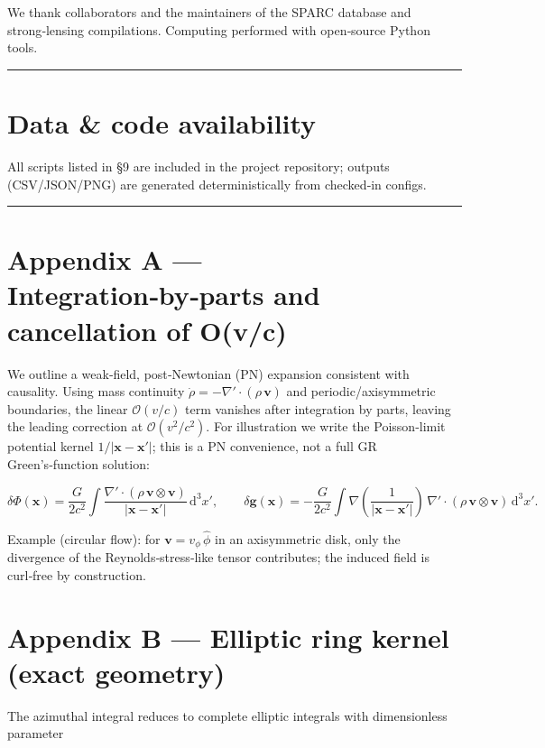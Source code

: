 \documentclass[11pt,a4paper]{article}
\begin{document}
We thank collaborators and the maintainers of the SPARC database and strong‑lensing compilations. Computing performed with open‑source Python tools.


\medskip\hrule\medskip


\section{Data \& code availability}


All scripts listed in §9 are included in the project repository; outputs (CSV/JSON/PNG) are generated deterministically from checked‑in configs.


\medskip\hrule\medskip


\section{Appendix A — Integration‑by‑parts and cancellation of O(v/c)}


We outline a weak‑field, post‑Newtonian (PN) expansion consistent with causality. Using mass continuity $\dot\rho=-\nabla'\!\cdot(\rho\,\mathbf{v})$ and periodic/axisymmetric boundaries, the linear $\mathcal{O}(v/c)$ term vanishes after integration by parts, leaving the leading correction at $\mathcal{O}(v^2/c^2)$. For illustration we write the Poisson‑limit potential kernel $1/\lvert \mathbf{x}-\mathbf{x}'\rvert$; this is a PN convenience, not a full GR Green’s‑function solution:


\begin{equation}
\delta\Phi(\mathbf{x}) = \frac{G}{2c^2} \int \frac{\nabla'\!\cdot(\rho\,\mathbf{v}\!\otimes\!\mathbf{v})}{\lvert \mathbf{x}-\mathbf{x}'\rvert}\,\mathrm{d}^3\!x' ,\qquad
\delta\mathbf{g}(\mathbf{x}) = -\frac{G}{2c^2} \int \nabla\!\left(\frac{1}{\lvert \mathbf{x}-\mathbf{x}'\rvert}\right) \, \nabla'\!\cdot(\rho\,\mathbf{v}\!\otimes\!\mathbf{v})\,\mathrm{d}^3\!x' .
\end{equation}


Example (circular flow): for $\mathbf{v}=v_\phi\,\hat\phi$ in an axisymmetric disk, only the divergence of the Reynolds‑stress‑like tensor contributes; the induced field is curl‑free by construction.


\section{Appendix B — Elliptic ring kernel (exact geometry)}


The azimuthal integral reduces to complete elliptic integrals with dimensionless parameter
\end{document}
